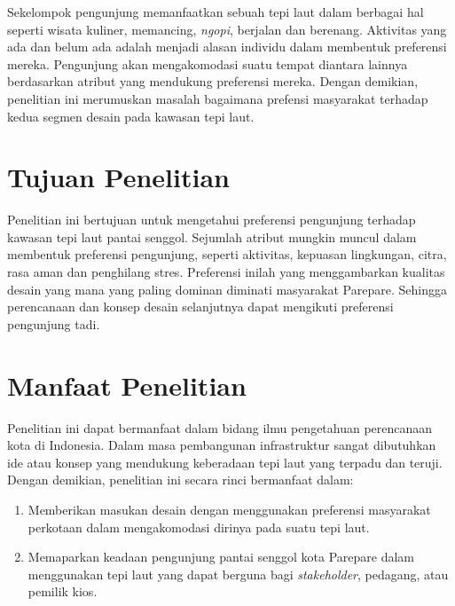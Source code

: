 \documentclass[../projects/thesis.tex]{subfiles}
\begin{document}
Sekelompok pengunjung memanfaatkan sebuah tepi laut dalam berbagai hal seperti wisata kuliner, memancing, \textit{ngopi}, berjalan dan berenang.
Aktivitas yang ada dan belum ada adalah menjadi alasan individu dalam membentuk preferensi mereka. Pengunjung akan mengakomodasi suatu tempat diantara lainnya berdasarkan atribut yang mendukung preferensi mereka. Dengan demikian, penelitian ini merumuskan masalah bagaimana prefensi masyarakat terhadap kedua segmen desain pada kawasan tepi laut.

\section{Tujuan Penelitian}
Penelitian ini bertujuan untuk mengetahui preferensi pengunjung terhadap kawasan tepi laut pantai senggol. Sejumlah atribut mungkin muncul dalam membentuk preferensi pengunjung, seperti aktivitas, kepuasan lingkungan, citra, rasa aman dan penghilang stres.
Preferensi inilah yang menggambarkan kualitas desain yang mana yang paling dominan diminati masyarakat Parepare. Sehingga perencanaan dan konsep desain selanjutnya dapat mengikuti preferensi pengunjung tadi.

\section{Manfaat Penelitian}
Penelitian ini dapat bermanfaat dalam bidang ilmu pengetahuan perencanaan kota di Indonesia. Dalam masa pembangunan infrastruktur sangat dibutuhkan ide atau konsep yang mendukung keberadaan tepi laut yang terpadu dan teruji. Dengan demikian, penelitian ini secara rinci bermanfaat dalam:

\begin{enumerate}
    \item Memberikan masukan desain dengan menggunakan preferensi masyarakat perkotaan dalam mengakomodasi dirinya pada suatu tepi laut.
    \item Memaparkan keadaan pengunjung pantai senggol kota Parepare dalam menggunakan tepi laut yang dapat berguna bagi \textit{stakeholder}, pedagang, atau pemilik kios.
\end{enumerate}





\end{document}
